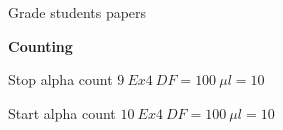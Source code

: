 \documentclass[idxtotoc,hyperref,openany,oneside]{labbook} %
\newcommand{\HRule}{\rule{\linewidth}{0.5mm}} %
\newcommand{\cmark}{\ding{51}}%
\newcommand{\xmark}{\ding{55}}%
\newcommand{\done}{\rlap{$\square$}{\raisebox{2pt}{\large\hspace{1pt}\cmark}}%
  \hspace{-2.5pt}}
\newcommand{\wontfix}{\rlap{$\square$}{\large\hspace{1pt}\xmark}}
\begin{document}
\begin{todolist}
\item{Grade students papers}
\end{todolist}


\textbf{Counting}
\begin{todolist}
\item{Stop alpha count $\boxed{9\ Ex4\ DF=100\ \mu l=10}$}
\item{Start alpha count $\boxed{10\ Ex4\ DF=100\ \mu l=10}$}
\end{todolist}











\end{document}
